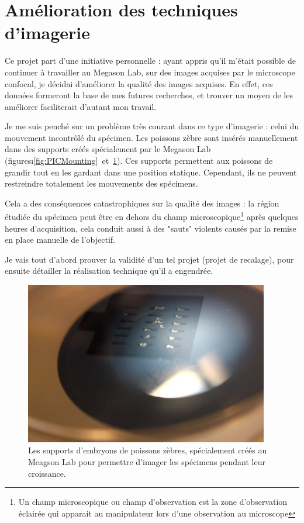 \section{Amélioration des techniques d'imagerie}

Ce projet part d'une initiative personnelle : ayant appris qu'il m'était possible de continuer à travailler au Megason Lab, sur des images acquises par le microscope confocal, je décidai d'améliorer la qualité des images acquises. En effet, ces données formeront la base de mes futures recherches, et trouver un moyen de les améliorer faciliterait d'autant mon travail.

Je me suis penché sur un problème très courant dans ce type d'imagerie : 
celui du mouvement incontrôlé du spécimen.
Les poissons zèbre sont insérés manuellement dans des supports créés spécialement par le Megason Lab (figuresı\ref{fig:PICMounting}~et~\ref{fig:PICMount}). Ces supports permettent aux poissons de grandir tout en les gardant dans une position statique. Cependant, ils ne peuvent restreindre totalement les mouvements des spécimens.

Cela a des conséquences catastrophiques sur la qualité des images : 
la région étudiée du spécimen peut être en dehors 
du champ microscopique\footnote{Un champ microscopique ou champ d'observation est la zone d'observation éclairée qui apparait au manipulateur lors d'une observation au microscope}
après quelques heures d'acquisition,
cela conduit aussi à des "sauts" violents causés par la remise en place manuelle de l'objectif.

Je vais tout d'abord prouver la validité d'un tel projet (projet de recalage), pour ensuite détailler la réalisation technique qu'il a engendrée.
\begin{figure}[h]
\begin{center}
\leavevmode
\includegraphics[width=0.95\textwidth]{pictures/PICmount}
\end{center}
\caption{Les supports d'embryons de poissons zèbres, spécialement créés au Meagson Lab pour permettre d'imager les spécimens pendant leur croissance.}
\label{fig:PICMount}
\end{figure}

